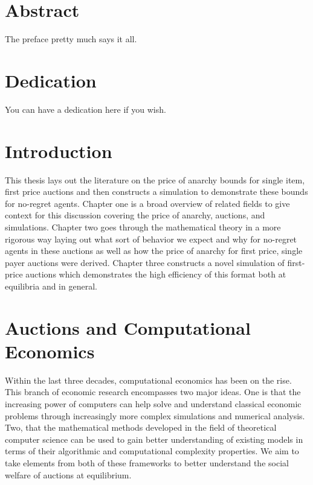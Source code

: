 \documentclass[12pt,twoside]{reedthesis}
\begin{document}
    \chapter*{Abstract}
	The preface pretty much says it all.
	
	\chapter*{Dedication}
	You can have a dedication here if you wish.

  \mainmatter %
  \pagestyle{fancyplain} %


    \chapter*{Introduction}

\doublespacing
	
	This thesis lays out the literature on the price of anarchy bounds for single item, first price auctions and then constructs
	 a simulation to demonstrate these bounds for no-regret agents. Chapter one is a broad overview of related fields to give context for this discussion covering the price of anarchy, auctions, and simulations. Chapter two goes through the mathematical theory in a more rigorous way laying out what sort of behavior we expect and why for no-regret agents in these auctions as well as how the price of anarchy for first price, single payer auctions were derived. Chapter three constructs a novel simulation of first-price auctions which demonstrates the high efficiency of this format both at equilibria and in general. 
	
\chapter{Auctions and Computational Economics}
	Within the last three decades, computational economics has been on the rise. This branch of economic research encompasses two major ideas. One is that the increasing power of computers can help solve and understand classical economic problems through increasingly more complex simulations and numerical analysis. Two, that the mathematical methods developed in the field of theoretical computer science can be used to gain better understanding of existing models in terms of their algorithmic and computational complexity properties. We aim to take elements from both of these frameworks to better understand the social welfare of auctions at equilibrium. 
\end{document}
